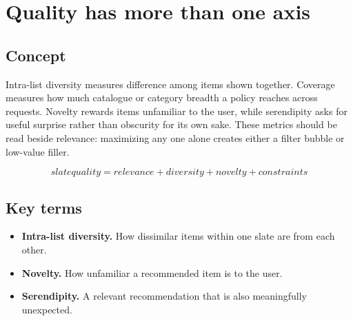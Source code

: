 \section{Quality has more than one axis}

\begin{abstract}
A relevant slate can still be repetitive, narrow or unsurprising.
\end{abstract}

\subsection{Concept}
Intra-list diversity measures difference among items shown together. Coverage measures how much catalogue or category breadth a policy reaches across requests. Novelty rewards items unfamiliar to the user, while serendipity asks for useful surprise rather than obscurity for its own sake. These metrics should be read beside relevance: maximizing any one alone creates either a filter bubble or low-value filler.

\begin{equation*}
slate quality = relevance + diversity + novelty + constraints
\end{equation*}

\subsection{Key terms}
\begin{itemize}
\item \textbf{Intra-list diversity.} How dissimilar items within one slate are from each other.
\item \textbf{Novelty.} How unfamiliar a recommended item is to the user.
\item \textbf{Serendipity.} A relevant recommendation that is also meaningfully unexpected.
\end{itemize}
